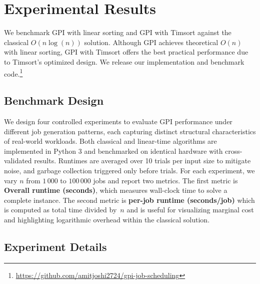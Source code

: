 \documentclass[final,5p,times]{elsarticle}
\begin{document}
\section{Experimental Results}
\label{sec:experiments}

We benchmark GPI with linear sorting and GPI with Timsort against the classical $O(n \log(n))$ solution. Although GPI achieves theoretical $O(n)$ with linear sorting, GPI with Timsort offers the best practical performance due to Timsort's optimized design. We release our implementation and benchmark code.\footnote{\url{https://github.com/amitjoshi2724/gpi-job-scheduling}}

\subsection{Benchmark Design}

We design four controlled experiments to evaluate GPI performance under different job generation patterns, each capturing distinct structural characteristics of real-world workloads. Both classical and linear-time algorithms are implemented in Python 3 and benchmarked on identical hardware with cross-validated results.
Runtimes are averaged over 10 trials per input size to mitigate noise, and garbage collection triggered only before trials. For each experiment, we vary $n$ from $1{\,}000$ to $100{\,}000$ jobs and report two metrics. The first metric is \textbf{Overall runtime (seconds)}, which measures wall-clock time to solve a complete instance. The second metric is \textbf{per-job runtime (seconds/job)} which is computed as total time divided by~$n$ and is useful for visualizing marginal cost and highlighting logarithmic overhead within the classical solution.

\subsection{Experiment Details}
\end{document}
